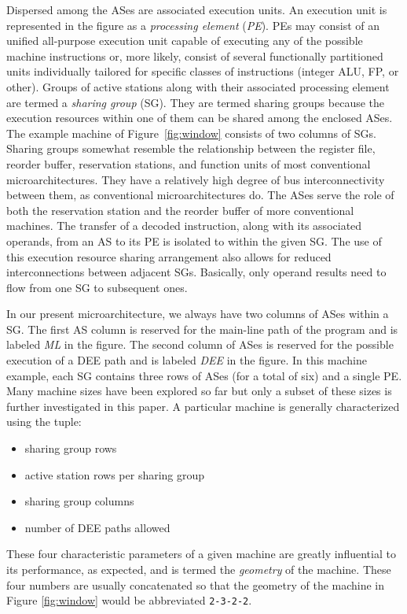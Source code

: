 \documentclass[10pt,twocolumn,dvips]{article}
\begin{document}
Dispersed among the ASes are associated execution
units.  An execution unit is represented in the figure as
a \textit{processing element} (\textit{PE}).  
PEs may consist of an unified all-purpose execution unit capable of
executing any of the possible machine instructions or, more likely,
consist of
several functionally partitioned units individually tailored
for specific classes of instructions (integer ALU, FP, or other).
Groups of active stations along with their associated processing
element are termed a \textit{sharing group} (SG).  
They are termed sharing groups because the execution
resources within one of them can be shared among the enclosed ASes.
The example machine of Figure~\ref{fig:window}
consists of two columns of SGs.  
Sharing groups somewhat resemble
the relationship between the register file, reorder buffer,
reservation stations, and function units of most conventional
microarchitectures.  They have a relatively high degree of bus
interconnectivity between them, as conventional microarchitectures do.
The ASes serve the role of both the
reservation station and the reorder buffer of more conventional
machines.
The transfer of a decoded instruction, along with its associated operands,
from an AS to its PE is isolated to within the given SG.
The use of this execution resource sharing arrangement also allows
for reduced interconnections between adjacent SGs.
Basically, only operand results need to flow from one SG
to subsequent ones.

In our present microarchitecture, we always have two 
columns of ASes within a SG.
The first AS column is
reserved for the main-line
path of the program and is
labeled \textit{ML}
in the figure.
The second column of ASes is reserved for the possible
execution of a DEE path and is
labeled \textit{DEE}
in the figure.
In this machine example, each SG contains three rows of ASes
(for a total of six) and a single PE.
Many machine sizes have been explored so far but only a subset
of these sizes is further investigated in this paper.
A particular machine is generally characterized using the tuple: 
%
\begin{itemize}
\item{sharing group rows}
\item{active station rows per sharing group}
\item{sharing group columns}
\item{number of DEE paths allowed}
\end{itemize}   
%
These four characteristic parameters of a given machine
are greatly influential to its performance, as expected,
and is termed the \textit{geometry} 
of the machine.
These four numbers are usually concatenated
so that the geometry of the machine in Figure \ref{fig:window}
would be abbreviated {\tt 2-3-2-2}.
\end{document}

